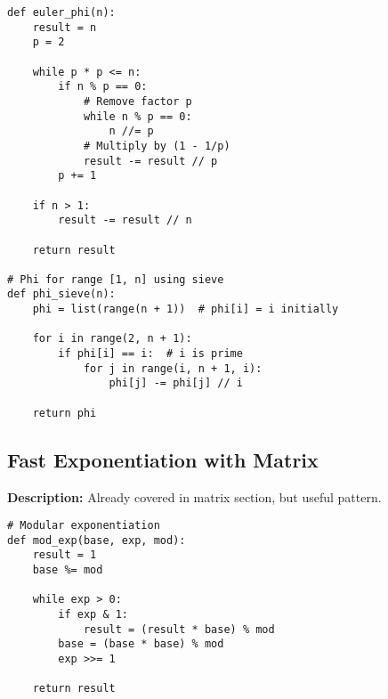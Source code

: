 \begin{lstlisting}
def euler_phi(n):
    result = n
    p = 2
    
    while p * p <= n:
        if n % p == 0:
            # Remove factor p
            while n % p == 0:
                n //= p
            # Multiply by (1 - 1/p)
            result -= result // p
        p += 1
    
    if n > 1:
        result -= result // n
    
    return result

# Phi for range [1, n] using sieve
def phi_sieve(n):
    phi = list(range(n + 1))  # phi[i] = i initially
    
    for i in range(2, n + 1):
        if phi[i] == i:  # i is prime
            for j in range(i, n + 1, i):
                phi[j] -= phi[j] // i
    
    return phi
\end{lstlisting}

\subsection{Fast Exponentiation with Matrix}
\textbf{Description:} Already covered in matrix section, but useful pattern.

\begin{lstlisting}
# Modular exponentiation
def mod_exp(base, exp, mod):
    result = 1
    base %= mod
    
    while exp > 0:
        if exp & 1:
            result = (result * base) % mod
        base = (base * base) % mod
        exp >>= 1
    
    return result
\end{lstlisting}
